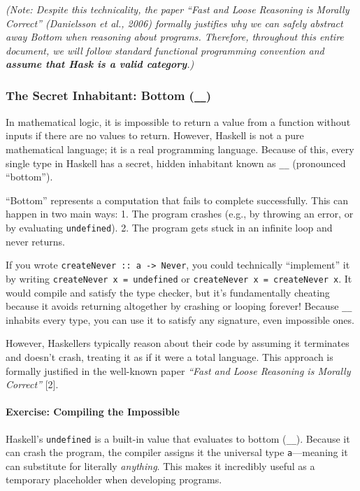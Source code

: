 \documentclass[
]{article}
\begin{document}
\emph{(Note: Despite this technicality, the paper ``Fast and Loose
Reasoning is Morally Correct'' (Danielsson et al., 2006) formally
justifies why we can safely abstract away Bottom when reasoning about
programs. Therefore, throughout this entire document, we will follow
standard functional programming convention and \textbf{assume that Hask
is a valid category}.)}

\subsubsection{\texorpdfstring{The Secret Inhabitant: Bottom
(\texttt{\_\textbar{}\_})}{The Secret Inhabitant: Bottom (\_\textbar\_)}}\label{the-secret-inhabitant-bottom-__}

In mathematical logic, it is impossible to return a value from a
function without inputs if there are no values to return. However,
Haskell is not a pure mathematical language; it is a real programming
language. Because of this, every single type in Haskell has a secret,
hidden inhabitant known as \texttt{\_\textbar{}\_} (pronounced
``bottom'').

``Bottom'' represents a computation that fails to complete successfully.
This can happen in two main ways: 1. The program crashes (e.g., by
throwing an error, or by evaluating \texttt{undefined}). 2. The program
gets stuck in an infinite loop and never returns.

If you wrote \texttt{createNever\ ::\ a\ -\textgreater{}\ Never}, you
could technically ``implement'' it by writing
\texttt{createNever\ x\ =\ undefined} or
\texttt{createNever\ x\ =\ createNever\ x}. It would compile and satisfy
the type checker, but it's fundamentally cheating because it avoids
returning altogether by crashing or looping forever! Because
\texttt{\_\textbar{}\_} inhabits every type, you can use it to satisfy
any signature, even impossible ones.

However, Haskellers typically reason about their code by assuming it
terminates and doesn't crash, treating it as if it were a total
language. This approach is formally justified in the well-known paper
\emph{``Fast and Loose Reasoning is Morally Correct''} {[}2{]}.

\paragraph{Exercise: Compiling the
Impossible}\label{exercise-compiling-the-impossible}

Haskell's \texttt{undefined} is a built-in value that evaluates to
bottom (\texttt{\_\textbar{}\_}). Because it can crash the program, the
compiler assigns it the universal type \texttt{a}---meaning it can
substitute for literally \emph{anything}. This makes it incredibly
useful as a temporary placeholder when developing programs.
\end{document}
